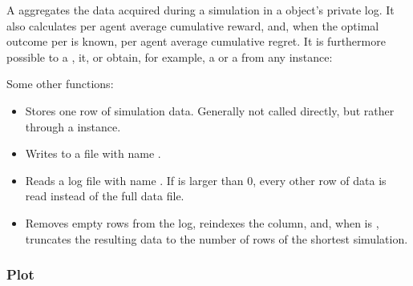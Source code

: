 \documentclass{jss}
\begin{document}
A  aggregates the data acquired during a simulation in a  object's private  log. It also calculates per agent average cumulative reward, and, when the optimal outcome per  is known, per agent average cumulative regret. It is furthermore possible to  a ,  it, or obtain, for example, a  or a  from any  instance:


Some other  functions:

\begin{itemize}
 \item{}{
    Stores one row of simulation data. Generally not called directly,
    but rather through a  instance.
 }
 \item{}{
    Writes  to a file with name .
 }
 \item{}{
    Reads a  log file with name .
    If  is larger than 0, every other  row of data is read instead of the
    full data file.
 }
 \item{}{
    Removes empty rows from the  log, reindexes the  column, and,
    when  is , truncates the resulting data to the number of rows of the shortest
    simulation.
 }
\end{itemize}

\subsubsection{Plot}
\end{document}
